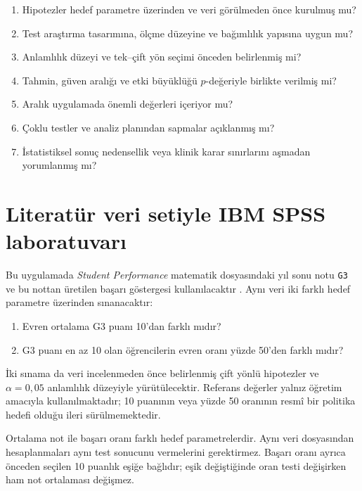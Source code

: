 \begin{enumerate}
  \item Hipotezler hedef parametre üzerinden ve veri görülmeden önce kurulmuş mu?
  \item Test araştırma tasarımına, ölçme düzeyine ve bağımlılık yapısına uygun mu?
  \item Anlamlılık düzeyi ve tek--çift yön seçimi önceden belirlenmiş mi?
  \item Tahmin, güven aralığı ve etki büyüklüğü $p$-değeriyle birlikte verilmiş mi?
  \item Aralık uygulamada önemli değerleri içeriyor mu?
  \item Çoklu testler ve analiz planından sapmalar açıklanmış mı?
  \item İstatistiksel sonuç nedensellik veya klinik karar sınırlarını aşmadan yorumlanmış mı?
\end{enumerate}

\section{Literatür veri setiyle IBM SPSS laboratuvarı}

Bu uygulamada \emph{Student Performance} matematik dosyasındaki yıl sonu notu
\texttt{G3} ve bu nottan üretilen başarı göstergesi kullanılacaktır
\cite{cortez2008data,cortezsilva2008}. Aynı veri iki farklı hedef parametre
üzerinden sınanacaktır:

\begin{enumerate}
  \item Evren ortalama G3 puanı 10'dan farklı mıdır?
  \item G3 puanı en az 10 olan öğrencilerin evren oranı yüzde 50'den farklı mıdır?
\end{enumerate}

İki sınama da veri incelenmeden önce belirlenmiş çift yönlü hipotezler ve
$\alpha=0{,}05$ anlamlılık düzeyiyle yürütülecektir. Referans değerler yalnız
öğretim amacıyla kullanılmaktadır; 10 puanının veya yüzde 50 oranının resmî
bir politika hedefi olduğu ileri sürülmemektedir.

\begin{researchbox}
Ortalama not ile başarı oranı farklı hedef parametrelerdir. Aynı veri
dosyasından hesaplanmaları aynı test sonucunu vermelerini gerektirmez. Başarı
oranı ayrıca önceden seçilen 10 puanlık eşiğe bağlıdır; eşik değiştiğinde oran
testi değişirken ham not ortalaması değişmez.
\end{researchbox}

